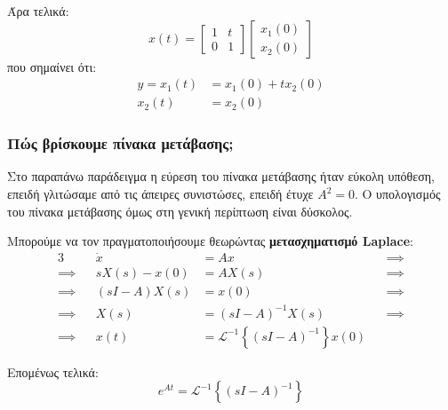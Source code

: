 \documentclass[11pt,a4paper,notitlepage,fleqn]{article}
\begin{document}
\begin{exercise}[Παράδειγμα]
	Άρα τελικά:
	\[
	x(t) = \left[\begin{matrix}
	1 & t \\ 0 & 1
	\end{matrix}\right]\left[\begin{matrix}
	x_1(0) \\ x_2(0)
	\end{matrix}\right]
	\]
	που σημαίνει ότι:
	\begin{align*}
		y = x_1(t) &= x_1(0) + tx_2(0)\\
		x_2(t) &= x_2(0)
	\end{align*}
	
\end{exercise}

\subsubsection{Πώς βρίσκουμε πίνακα μετάβασης;}

Στο παραπάνω παράδειγμα η εύρεση του πίνακα μετάβασης ήταν εύκολη υπόθεση, επειδή γλιτώσαμε από τις άπειρες
συνιστώσες, επειδή έτυχε \( A^2 = 0 \). Ο υπολογισμός του πίνακα μετάβασης όμως στη γενική περίπτωση είναι
δύσκολος.

Μπορούμε να τον πραγματοποιήσουμε θεωρώντας \textbf{μετασχηματισμό Laplace}:
\begin{alignat*}{3}
	&& \dot x &= Ax &&\implies \\
	\implies && sX(s) - x(0) &= AX(s) &&\implies \\
	\implies && (sI-A)X(s) &= x(0) &&\implies \\
	\implies && X(s) &= (sI-A)^{-1} X(s) &&\implies \\
	\implies && x(t) &= \mathscr L^{-1} \left\lbrace (sI-A)^{-1} \right\rbrace x(0)
\end{alignat*}

Επομένως τελικά:
\[
\boxed{e^{At} = \mathscr{L}^{-1} \left\lbrace (sI-A)^{-1} \right\rbrace}
\]
\end{document}
